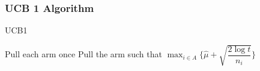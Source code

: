 \documentclass{beamer}
\begin{document}

\frametitle{UCB 1 Algorithm}
\begin{algorithm}[!h]
\caption{UCB1}
\begin{algorithmic}[1]
\State Pull each arm once
\State Pull the arm such that $\max_{i\in A}\bigg\lbrace\hat{\mu} + \sqrt{\dfrac{2\log t}{n_i}}\bigg\rbrace$
 \EndFor
\end{algorithmic}
\end{algorithm}


%
\end{document}
